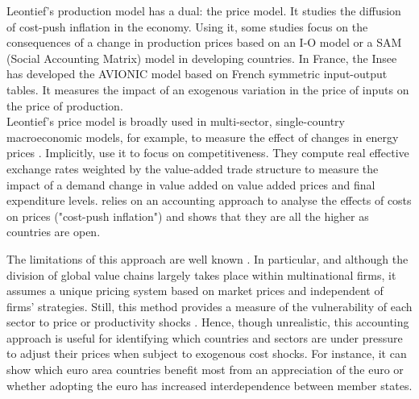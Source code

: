 \documentclass[11pt,a4paper]{article}
\begin{document}
Leontief's production model has a dual: the price model.
It studies the diffusion of cost-push inflation in the economy.
Using it, some studies focus on the consequences of a change in production prices based on an I-O model or a SAM (Social Accounting Matrix) model in developing countries.
In France, the Insee \citep{Bourgeois2019} has developed the AVIONIC model based on French symmetric input-output tables. 
It measures the impact of an exogenous variation in the price of inputs on the price of production. \\
Leontief's price model is broadly used in multi-sector, single-country macroeconomic models, for example, to measure the effect of changes in energy prices \citep{Bournay2015, Sharify2013}. Implicitly, \cite{Bems2015} use it to focus on competitiveness. 
They compute real effective exchange rates weighted by the value-added trade structure to measure the impact of a demand change in value added on value added prices and final expenditure levels. %
\cite{Cochard2016} relies on an accounting approach to analyse the effects of costs on prices ("cost-push inflation") and shows that they are all the higher as countries are open.

The limitations of this approach are well known \citep{Folloni1994}. In particular, and although the division of global value chains largely takes place within multinational firms, it assumes a unique pricing system based on market prices and independent of firms' strategies. Still, this method provides a measure of the vulnerability of each sector to price or productivity shocks \citep{Acemoglu2012,Carvalho2014}. 
Hence, though unrealistic, this accounting approach is useful for identifying which countries and sectors are under pressure to adjust their prices when subject to exogenous cost shocks. For instance, it can show which euro area countries benefit most from an appreciation of the euro or whether adopting the euro has increased interdependence between member states.
\end{document}
